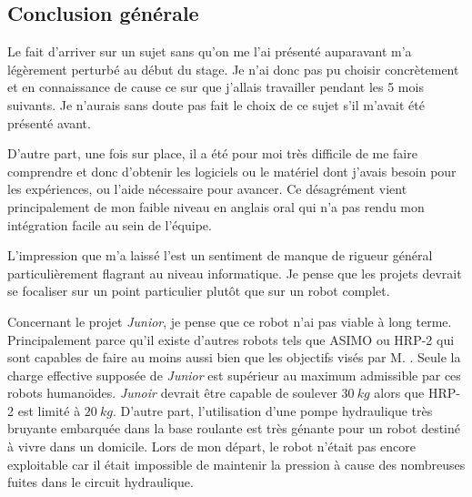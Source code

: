 \subsection{Conclusion générale}
\label{sub:conclusion}

Le fait d'arriver sur un sujet sans qu'on me l'ai pr\'esent\'e auparavant m'a l\'eg\`erement perturb\'e au d\'ebut du stage.
Je n'ai donc pas pu choisir concr\`etement et en connaissance de cause ce sur que j'allais travailler pendant les 5 mois suivants.
Je n'aurais sans doute pas fait le choix de ce sujet s'il m'avait \'et\'e pr\'esent\'e avant.

D'autre part, une fois sur place, il a \'et\'e pour moi tr\`es difficile de me faire comprendre et donc d'obtenir les logiciels ou le mat\'eriel dont j'avais besoin pour les exp\'eriences, ou l'aide n\'ecessaire pour avancer.
Ce d\'esagr\'ement vient principalement de mon faible niveau en anglais oral qui n'a pas rendu mon int\'egration facile au sein de l'\'equipe.

L'impression que m'a laiss\'e l'\umassey est un sentiment de manque de rigueur g\'en\'eral particuli\`erement flagrant au niveau informatique. Je pense que les projets devrait se focaliser sur un point particulier plutôt que sur un robot complet.

\saut
Concernant le projet \emph{Junior}, je pense que ce robot n'ai pas viable \`a long terme.
Principalement parce qu'il existe d'autres robots tels que ASIMO ou HRP-2 qui sont capables de faire au moins aussi bien que les objectifs vis\'es par M. \rory.
Seule la charge effective suppos\'ee de \emph{Junior} est sup\'erieur au maximum admissible par ces robots humano\"{\i}des.
\emph{Junoir} devrait \^etre capable de soulever $30~kg$ alors que HRP-2 est limit\'e \`a $20~kg$.
D'autre part, l'utilisation d'une pompe hydraulique tr\`es bruyante embarqu\'ee dans la base roulante est tr\`es g\'enante pour un robot destin\'e \`a vivre dans un domicile.
Lors de mon d\'epart, le robot n'\'etait pas encore exploitable car il \'etait impossible de maintenir la pression \`a cause des nombreuses fuites dans le circuit hydraulique. 
